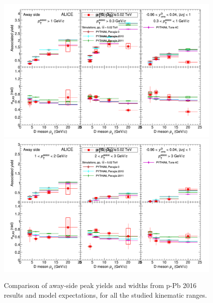 \begin{figure}[!htbp]
\centering
\landscape
{\includegraphics[width=\linewidth]{figures/CfrPPandModels/ComparePPbtoMCFitResultsAS.png}}
{\includegraphics[width=\linewidth]{figures/CfrPPandModels/ComparePPbtoMCFitResultsAS_2.png}}
\caption{Comparison of away-side peak yields and widths from p-Pb 2016 results and model expectations, for all the studied kinematic ranges.}
\label{fig:CfrAverageModel2}
\end{figure}

